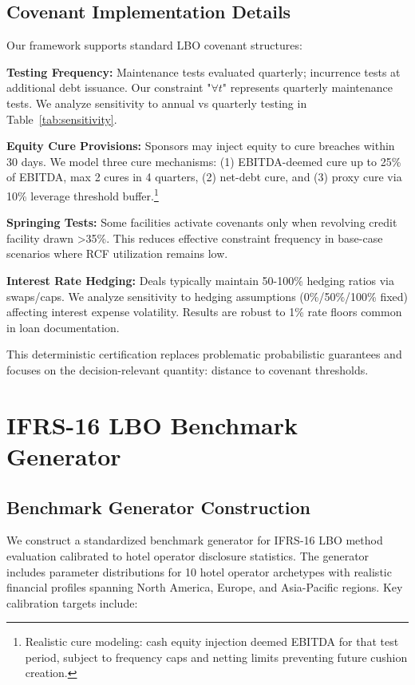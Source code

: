 \documentclass[11pt,a4paper]{article}
\begin{document}
\subsection{Covenant Implementation Details}

Our framework supports standard LBO covenant structures:

\textbf{Testing Frequency:} Maintenance tests evaluated quarterly; incurrence tests at additional debt issuance. Our constraint "$\forall t$" represents quarterly maintenance tests. We analyze sensitivity to annual vs quarterly testing in Table~\ref{tab:sensitivity}.

\textbf{Equity Cure Provisions:} Sponsors may inject equity to cure breaches within 30 days. We model three cure mechanisms: (1) EBITDA-deemed cure up to 25\% of EBITDA, max 2 cures in 4 quarters, (2) net-debt cure, and (3) proxy cure via 10\% leverage threshold buffer.\footnote{Realistic cure modeling: cash equity injection deemed EBITDA for that test period, subject to frequency caps and netting limits preventing future cushion creation.}

\textbf{Springing Tests:} Some facilities activate covenants only when revolving credit facility drawn >35\%. This reduces effective constraint frequency in base-case scenarios where RCF utilization remains low.

\textbf{Interest Rate Hedging:} Deals typically maintain 50-100\% hedging ratios via swaps/caps. We analyze sensitivity to hedging assumptions (0\%/50\%/100\% fixed) affecting interest expense volatility. Results are robust to 1\% rate floors common in loan documentation.

This deterministic certification replaces problematic probabilistic guarantees and focuses on the decision-relevant quantity: distance to covenant thresholds.

\section{IFRS-16 LBO Benchmark Generator}

\subsection{Benchmark Generator Construction}

We construct a standardized benchmark generator for IFRS-16 LBO method evaluation calibrated to hotel operator disclosure statistics. The generator includes parameter distributions for 10 hotel operator archetypes with realistic financial profiles spanning North America, Europe, and Asia-Pacific regions. Key calibration targets include:
\end{document}
